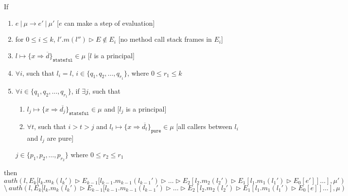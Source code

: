 \documentclass{llncs}
\newcommand{\keywadj}[1]{\mathtt{#1}}
\newcommand{\intuition}[1]{#1}
\begin{document}
\begin{mdframed}
\begin{lemma}
\label{l:a-diff}
If
\begin{enumerate}
\item $e~|~\mu \longrightarrow e'~|~\mu'$ \intuition{\hspace{230pt} [$e$ can make a step of evaluation]}
\item for $0 \leq i \leq k$, $l'.m(l'') \rhd E \not\in E_i$ \intuition{\hspace{150pt} [no method call stack frames in $E_i$]}
\item $l \mapsto \{ x \Rightarrow \overline{d} \}_{\keywadj{stateful}} \in \mu$ \intuition{\hspace{270pt} [$l$ is a principal]}
\item $\forall i$, such that $l_i = l$, $i \in \{ q_1, q_2, \dots, q_{r_1} \}$, where $0 \leq r_1 \leq k$ \intuition{}
\item $\forall i \in \{ q_1, q_2, \dots, q_{r_1} \}$, if $\exists j$, such that
\begin{enumerate}
\item $l_j \mapsto \{ x \Rightarrow \overline{d_j} \}_{\keywadj{stateful}} \in \mu$ and \intuition{\hspace{220pt} [$l_j$ is a principal]}
\item $\forall t$, such that $i > t > j$ and $l_t \mapsto \{ x \Rightarrow \overline{d_t} \}_{\keywadj{pure}} \in \mu$ \intuition{\hspace{40pt} [all callers between $l_i$ and $l_j$ are pure]}
\end{enumerate}
$j \in \{ p_1, p_2, \dots, p_{r_2}\}$ where $0 \leq r_2 \leq r_1$
\intuition{}
\end{enumerate}
then
\noindent$auth(l, E_k[l_k.m_k(l_k') \rhd E_{k-1}[l_{k-1}.m_{k-1}(l_{k-1}') \rhd \dots \rhd E_2[l_2.m_2(l_2') \rhd E_1[l_1.m_1(l_1') \rhd E_0[e']] \dots ], \mu')$\\
$\setminus~auth(l, E_k[l_k.m_k(l_k') \rhd E_{k-1}[l_{k-1}.m_{k-1}(l_{k-1}') \rhd \dots \rhd E_2[l_2.m_2(l_2') \rhd E_1[l_1.m_1(l_1') \rhd E_0[e]] \dots ], \mu)$

\end{lemma}
\end{mdframed}
\end{document}
